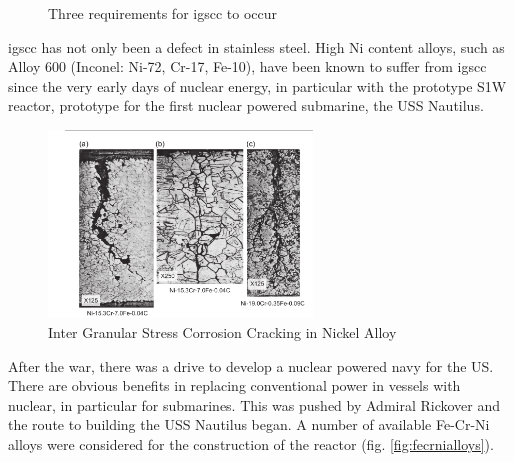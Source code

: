 \begin{figure}
  \begin{center}
\caption{Three requirements for \acrshort{igscc} to occur}
\label{fig:igsccrequirements}
\end{center}
\end{figure}

\acrshort{igscc} has not only been a defect in stainless steel.  High Ni content alloys, such as Alloy 600 (Inconel:  Ni-72, Cr-17, Fe-10),  have been known to suffer from \acrshort{igscc} since the very early days of nuclear energy, in particular with the prototype S1W reactor, prototype for the first nuclear powered submarine, the USS Nautilus.

\begin{figure}
  \begin{center}
    \includegraphics[width=7.0cm]{chapters/austenitic_steels_in_nuclear/images/igscc_nickel_alloy600.png}
    \caption{Inter Granular Stress Corrosion Cracking in Nickel Alloy\cite{staehlecoriou}}
    \label{image:igsccni}
  \end{center}
\end{figure}

After the war, there was a drive to develop a nuclear powered navy for the US.  There are obvious benefits in replacing conventional power in vessels with nuclear, in particular for submarines.  This was pushed by Admiral Rickover and the route to building the USS Nautilus began.  A number of available Fe-Cr-Ni alloys were considered for the construction of the reactor (fig. \ref{fig:fecrnialloys}).

